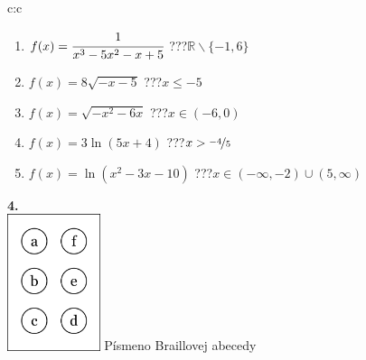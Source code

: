\documentclass[10pt]{report}
\begin{document}
\begin{tabular}{c:c}
\begin{minipage}[c][104.5mm][t]{0.5\linewidth}
\begin{center}
\begin{minipage}{0.79\linewidth}
\begin{center}
\begin{varwidth}{\linewidth}
\begin{enumerate}
\item $f(x)=\cfrac{1}{x^3-5x^2-x+5}$\quad \dotfill\; ???\;\dotfill \quad $\mathbb{R}\smallsetminus\{-1,6\}$
\item $f(x)=8\sqrt{-x-5}$\quad \dotfill\; ???\;\dotfill \quad $x\leq-5$
\item $f(x)=\sqrt{-x^2-6x}$\quad \dotfill\; ???\;\dotfill \quad $x\in(-6 , 0)$
\item $f(x)=3\ln{(5x+4)}$\quad \dotfill\; ???\;\dotfill \quad $x>\nicefrac{-4}{5}$
\item $f(x)=\ln{(x^2-3x-10)}$\quad \dotfill\; ???\;\dotfill \quad $x\in(-\infty , -2)\cup(5 , \infty)$
\end{enumerate}
\end{varwidth}
\end{center}
\end{minipage}
\begin{minipage}{0.20\linewidth}
\begin{center}
{\Huge\bfseries 4.} \\[2mm]
\includegraphics[height=40mm]{../images/braille.png}
{\small Písmeno Braillovej abecedy}
\end{center}
\end{minipage}
\end{center}
\end{minipage}
%
\end{tabular}
\newpage
\thispagestyle{empty}
\end{document}
